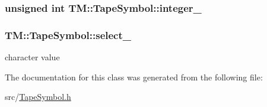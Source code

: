 \hypertarget{classTM_1_1TapeSymbol_a09b69817f96736cc1f958d6c2d2aa2b0}{
\subsubsection[{integer\-\_\-}]{\setlength{\rightskip}{0pt plus 5cm}unsigned int {\bf \-T\-M\-::\-Tape\-Symbol\-::integer\-\_\-}}}\label{d8/d62/classTM_1_1TapeSymbol_a09b69817f96736cc1f958d6c2d2aa2b0}
\hypertarget{classTM_1_1TapeSymbol_af84d020bd2a06906fc7bb461cf16fb14}{
\subsubsection[{select\-\_\-}]{ {\bf \-T\-M\-::\-Tape\-Symbol\-::select\-\_\-}}}\label{d8/d62/classTM_1_1TapeSymbol_af84d020bd2a06906fc7bb461cf16fb14}


character value 



\-The documentation for this class was generated from the following file\-:\begin{DoxyCompactItemize}
\item 
src/\hyperlink{TapeSymbol_8h}{\-Tape\-Symbol.\-h}\end{DoxyCompactItemize}
